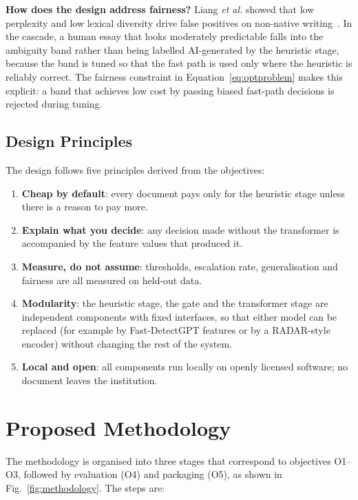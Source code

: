\textbf{How does the design address fairness?} Liang \textit{et al.}
showed that low perplexity and low lexical diversity drive false positives on
non-native writing~\cite{liang2023biased}. In the cascade, a human essay that
looks moderately predictable falls into the ambiguity band rather than being
labelled AI-generated by the heuristic stage, because the band is tuned so that
the fast path is used only where the heuristic is reliably correct. The
fairness constraint in Equation~\eqref{eq:optproblem} makes this explicit: a
band that achieves low cost by passing biased fast-path decisions is rejected
during tuning.

\subsection{Design Principles}

The design follows five principles derived from the objectives:
\begin{enumerate}
  \item \textbf{Cheap by default}: every document pays only for the heuristic
        stage unless there is a reason to pay more.
  \item \textbf{Explain what you decide}: any decision made without the
        transformer is accompanied by the feature values that produced it.
  \item \textbf{Measure, do not assume}: thresholds, escalation rate,
        generalisation and fairness are all measured on held-out data.
  \item \textbf{Modularity}: the heuristic stage, the gate and the transformer
        stage are independent components with fixed interfaces, so that either
        model can be replaced (for example by Fast-DetectGPT features or by a
        RADAR-style encoder) without changing the rest of the system.
  \item \textbf{Local and open}: all components run locally on openly licensed
        software; no document leaves the institution.
\end{enumerate}

\section{Proposed Methodology}

The methodology is organised into three stages that correspond to objectives
O1--O3, followed by evaluation (O4) and packaging (O5), as shown in
Fig.~\ref{fig:methodology}. The steps are:

